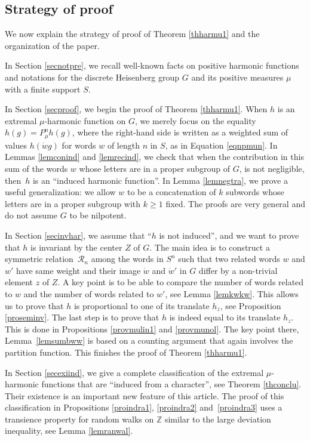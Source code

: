 \documentclass[11pt]{article}
\numberwithin{equation}{section}
\let\mathcal\mathscr
\theoremstyle{definition}
\newcommand{\m}[1]{\mathbb{ #1}}
\newcommand{\mc}[1]{\mathcal{ #1}}
\let\bq\relax
\let\eq\relax
\begin{document}
\subsection{Strategy of proof}
\label{secstrpro}
\bq
We now explain the strategy of proof of Theorem \ref{thharmu1}
and the organization of the paper.
\eq

In Section \ref{secnotpre}, we recall well-known facts on positive harmonic functions
and notations for the discrete Heisenberg group $G$
and its positive measures $\mu$ with a finite support $S$.

In Section \ref{secproof}, we begin the proof of Theorem \ref{thharmu1}.
When $h$ is an extremal $\mu$-harmonic function on $G$, we merely focus on the
equality
$h(g)=P^n_\mu h(g)$, where the right-hand side is written as a weighted sum
of values $h(\dot{w}g)$ for words $w$ of length $n$ in $S$,
as in Equation \eqref{eqnpmun}.
In Lemmas \ref{lemconind} and \ref{lemrecind},
we check that when the contribution in this sum
of the words $w$ whose letters are in a proper subgroup of $G$,
is not negligible,
then~$h$ is an ``induced harmonic function''.
In Lemma \ref{lemnegtra}, we prove a useful generalization:
we allow $w$ to be a concatenation of $k$ subwords
whose letters are in a proper subgroup with $k \geq 1$ fixed.
The proofs are very general
and do not assume $G$ to be nilpotent.

In Section \ref{secinvhar}, we assume that ``$h$ is not induced'',
and we want to prove that $h$ is invariant by the center $Z$ of $G$.
The main idea is to construct a symmetric relation~$\mc R_n$
among the words in $S^n$ such that
two related words $w$ and $w'$ have same weight
and their image $\dot{w}$ and $\dot{w}'$ in $G$
differ by a non-trivial element $z$ of $Z$.
A key point is to be able to compare the number of words related to $w$
and the number of words related to $w'$, see Lemma \ref{lemkwkw}. This allows
us to prove that $h$ is proportional to one of its translate $h_z$,
see Proposition \ref{proseminv}.
The last step is to prove that $h$ is indeed equal to its translate $h_z$.
This is done in Propositions \ref{provmulin1} and \ref{provmunol}.
The key point there, Lemma~\ref{lemsumbww} is based
on a counting argument that again involves the partition function.
This finishes the proof of Theorem \ref{thharmu1}.

In Section \ref{secexiind}, we give a complete classification of the
extremal $\mu$-harmonic functions that are ``induced
from a character'',
see Theorem \ref{thconclu}.
Their existence is an important new feature of this article.
The proof of this classification in Propositions \ref{proindra1}, \ref{proindra2} and~\ref{proindra3}
uses a transience property for random walks on $\m Z$
similar to the large deviation inequality, see Lemma \ref{lemranwal}.
\end{document}
